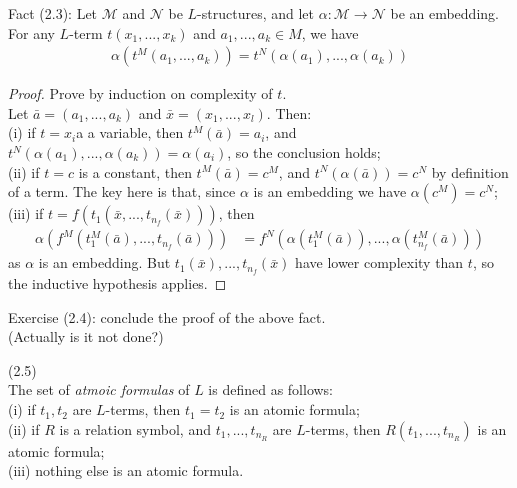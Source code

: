 \documentclass[a4paper]{article}
\begin{document}
Fact (2.3): Let $\mathcal{M}$ and $\mathcal{N}$ be $L$-structures, and let $\alpha:\mathcal{M} \to \mathcal{N}$ be an embedding. For any $L$-term $t(x_1,...,x_k)$ and $a_1,...,a_k \in M$, we have
\begin{equation*}
    \begin{aligned}
        \alpha(t^M(a_1,...,a_k)) = t^N(\alpha(a_1),...,\alpha(a_k))
    \end{aligned}
\end{equation*}
\begin{proof}
Prove by induction on complexity of $t$.\\
Let $\bar{a} = (a_1,...,a_k)$ and $\bar{x} = (x_1,...,x_l)$. Then:\\
(i) if $t=x_i$a a variable, then $t^M(\bar{a}) = a_i$, and $t^N(\alpha(a_1),...,\alpha(a_k)) = \alpha(a_i)$, so the conclusion holds;\\
(ii) if $t=c$ is a constant, then $t^M(\bar{a}) = c^M$, and $t^N(\alpha(\bar{a})) = c^N$ by definition of a term. The key here is that, since $\alpha$ is an embedding we have $\alpha(c^M) = c^N$;\\
(iii) if $t = f(t_1(\bar{x},...,t_{n_f}(\bar{x})))$, then
\begin{equation*}
    \begin{aligned}
    \alpha(f^M(t_1^M(\bar{a}),...,t_{n_f}(\bar{a}))) &= f^N(\alpha (t_1^M(\bar{a})),...,\alpha(t_{n_f}^M(\bar{a})))
    \end{aligned}
\end{equation*}
as $\alpha$ is an embedding. But $t_1(\bar{x}),...,t_{n_f}(\bar{x})$ have lower complexity than $t$, so the inductive hypothesis applies.
\end{proof}

Exercise (2.4): conclude the proof of the above fact.\\
(Actually is it not done?)

\begin{defi} (2.5)\\
    The set of \emph{atmoic formulas} of $L$ is defined as follows:\\
    (i) if $t_1,t_2$ are $L$-terms, then $t_1 = t_2$ is an atomic formula;\\
    (ii) if $R$ is a relation symbol, and $t_1,...,t_{n_R}$ are $L$-terms, then $R(t_1,...,t_{n_R})$ is an atomic formula;\\
    (iii) nothing else is an atomic formula.
\end{defi}
\end{document}
